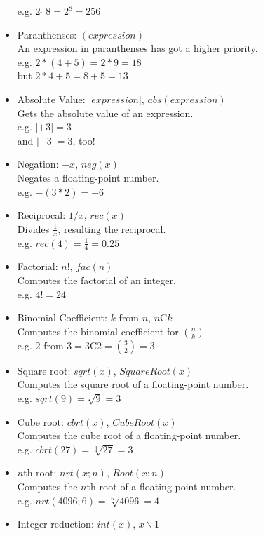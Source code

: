\documentclass[12pt,a4paper]{article}
\begin{document}
\begin{itemize}
			  e.g. $2 \; \hat{ } \; 8 = 2 ^{8} = 256$
		\item Paranthenses: $(expression)$\\
			  An expression in paranthenses has got a higher priority.\\
			  e.g. $2 * (4 + 5) = 2 * 9 = 18$\\
			  but $2 * 4 + 5 = 8 + 5 = 13$
		\item Absolute Value: $|expression|$, $abs(expression)$\\
			  Gets the absolute value of an expression.\\
			  e.g. $|+3| = 3$\\
			  and $|-3| = 3$, too!
		\item Negation: $-x$, $neg(x)$\\
		      Negates a floating-point number.\\
		      e.g. $- (3 * 2) = -6$
		\item Reciprocal: $1/x$, $rec(x)$\\
			  Divides $\frac{1}{x}$, resulting the reciprocal.\\
			  e.g. $rec(4) = \frac{1}{4} = 0.25$
		\item Factorial: $n!$, $fac(n)$\\
			  Computes the factorial of an integer.\\
			  e.g. $4! = 24$
		\item Binomial Coefficient: $k$ from $n$, $n$C$k$\\
			  Computes the binomial coefficient for $n \choose k$\\
			  e.g. $2$ from $3 = 3$C$2 = {3 \choose 2} = 3$
		\item Square root: $sqrt(x)$, $SquareRoot(x)$\\
			  Computes the square root of a floating-point number.\\
			  e.g. $sqrt(9) = \sqrt{9} = 3$
		\item Cube root: $cbrt(x)$, $CubeRoot(x)$\\
			  Computes the cube root of a floating-point number.\\
			  e.g. $cbrt(27) = \sqrt[3]{27} = 3$
		\item $n$th root: $nrt(x; n)$, $Root(x; n)$\\
			  Computes the $n$th root of a floating-point number.\\
			  e.g. $nrt(4096; 6) = \sqrt[6]{4096} = 4$
		\item Integer reduction: $int(x)$, $x\backslash1$\\

\end{itemize}
\end{document}
